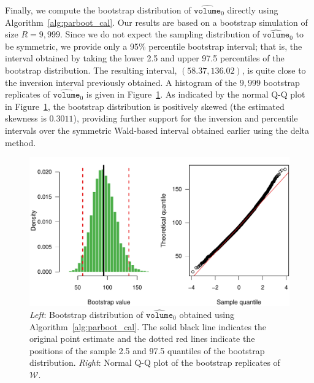 \documentclass[cmfont,usenames,dvipsnames,leqno]{afit-etd}\usepackage[]{graphicx}\usepackage[]{color}
\makeatletter
\def\maxwidth{ %
  \ifdim\Gin@nat@width>\linewidth
    \linewidth
  \else
    \Gin@nat@width
  \fi
}
\newenvironment{knitrout}{}{} %
\renewenvironment{knitrout}{\begin{singlespace}}{\end{singlespace}}
\newcommand{\mc}[1]{\ensuremath{\mathcal{#1}}}
\newcommand{\wh}[1]{\ensuremath{\widehat{#1}}}
\makeatother
\begin{document}
Finally, we compute the bootstrap distribution of $\wh{\texttt{volume}}_0$ directly using Algorithm~\ref{alg:parboot_cal}. Our results are based on a bootstrap simulation of size $R = 9,999$. Since we do not expect the sampling distribution of $\wh{\texttt{volume}}_0$ to be symmetric, we provide only a 95\% percentile bootstrap interval; that is, the interval obtained by taking the lower 2.5 and upper 97.5 percentiles of the bootstrap distribution. The resulting interval, $(58.37, 136.02)$, is quite close to the inversion interval previously obtained. A histogram of the $9,999$ bootstrap replicates of $\wh{\texttt{volume}}_0$ is given in Figure~\ref{fig:bladder-parboot-hist2}. As indicated by the normal Q-Q plot in Figure~\ref{fig:bladder-parboot-hist2}, the bootstrap distribution is positively skewed (the estimated skewness is $0.3011$), providing further support for the inversion and percentile intervals over the symmetric Wald-based interval obtained earlier using the delta method. 

\begin{knitrout}
\color{fgcolor}\begin{figure}[H]

\includegraphics[width=\maxwidth]{figure/bladder-parboot-hist2} \caption[Bootstrap distribution of $\wh{\texttt{volume}}_0$ obtained using Algorithm~\ref{alg:parboot_cal}]{\textit{Left}: Bootstrap distribution of $\wh{\texttt{volume}}_0$ obtained using Algorithm~\ref{alg:parboot_cal}. The solid black line indicates the original point estimate and the dotted red lines indicate the positions of the sample 2.5 and 97.5 quantiles of the bootstrap distribution. \textit{Right}: Normal Q-Q plot of the bootstrap replicates of $\mc{W}$.\label{fig:bladder-parboot-hist2}}
\end{figure}


\end{knitrout}
\end{document}
